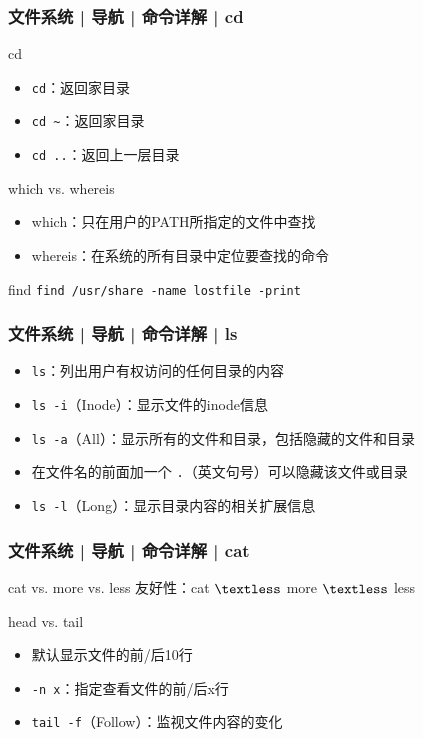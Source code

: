 \begin{frame}[fragile]
  \frametitle{文件系统 | 导航 | 命令详解 | cd}
  \begin{block}{\alert{cd}}
    \begin{itemize}
      \item \verb|cd|：返回家目录
      \item \verb|cd ~|：返回家目录
      \item \verb|cd ..|：返回上一层目录
    \end{itemize}
  \end{block}
  \pause
  \begin{block}{which vs. whereis}
    \begin{itemize}
      \item which：只在用户的PATH所指定的文件中查找
      \item whereis：在系统的所有目录中定位要查找的命令
    \end{itemize}
  \end{block}
  \pause
  \begin{block}{find}
    \verb|find /usr/share -name lostfile -print|
  \end{block}
\end{frame}

\begin{frame}[fragile]
  \frametitle{文件系统 | 导航 | 命令详解 | \alert{ls}}
  \begin{itemize}[<+->]
    \item \verb|ls|：列出用户有权访问的任何目录的内容
    \item \verb|ls -i|（Inode）：显示文件的inode信息
    \item \verb|ls -a|（All）：显示所有的文件和目录，包括隐藏的文件和目录
    \item 在文件名的前面加一个 \verb|.|（英文句号）可以隐藏该文件或目录
    \item \verb|ls -l|（Long）：显示目录内容的相关扩展信息
  \end{itemize}
  \begin{figure}
    \centering
  \end{figure}
\end{frame}

\begin{frame}[fragile]
  \frametitle{文件系统 | 导航 | 命令详解 | cat}
  \begin{block}{cat vs. more vs. less}
    友好性：cat $\textless$ more $\textless$ less
  \end{block}
  \pause
  \begin{block}{\alert{head vs. tail}}
    \begin{itemize}
      \item 默认显示文件的前/后10行
      \item \verb|-n x|：指定查看文件的前/后x行
      \item \verb|tail -f|（Follow）：监视文件内容的变化
    \end{itemize}
  \end{block}
\end{frame}

